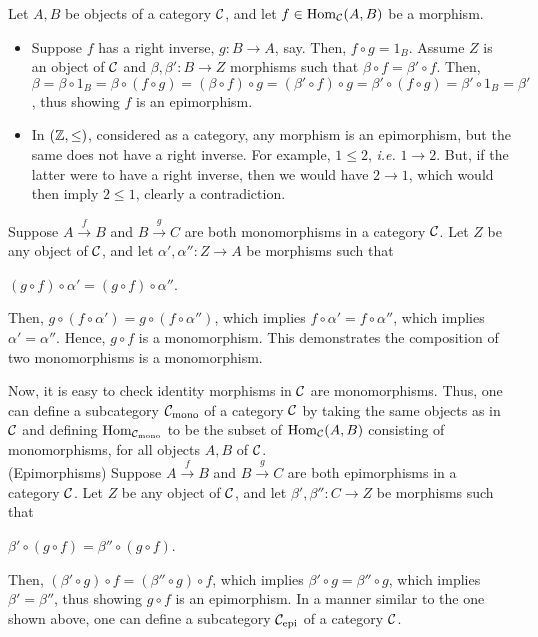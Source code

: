 \begin{xca}
Let $A, B$ be objects of a category $\mathcal{C}$, and let $f \in \operatorname{Hom}_{\mathcal{C}}(A,
B)$ be a morphism.
\begin{itemize}
    \item Suppose $f$ has a right inverse, $g: B \to A$, say. Then, $f \circ g
    = 1_B$. Assume $Z$ is an object of $\mathcal{C}$ and $\beta, \beta': B \to Z$
    morphisms such that $\beta \circ f = \beta' \circ f$. Then, $\beta = \beta
    \circ 1_B = \beta \circ (f \circ g) = (\beta \circ f) \circ g = (\beta'
    \circ f) \circ g = \beta' \circ (f \circ g) = \beta' \circ 1_B = \beta'$,
    thus showing $f$ is an epimorphism.
    \item In $(\mathbb{Z}, \le)$, considered as a category, any morphism is an
    epimorphism, but the same does not have a right inverse. For example, $1 \le
    2$, \emph{i.e.} $1 \to 2$. But, if the latter were to have a right inverse,
    then we would have $2 \to 1$, which would then imply $2 \le 1$, clearly a
    contradiction.
\end{itemize}
\end{xca}

\begin{xca}
Suppose $A \xrightarrow{f} B$ and $B \xrightarrow{g} C$ are both monomorphisms
in a category $\mathcal{C}$. Let $Z$ be any object of $\mathcal{C}$, and let $\alpha',
\alpha'': Z \to A$ be morphisms such that
\begin{center}
    $(g \circ f) \circ \alpha' = (g \circ f) \circ \alpha''$.
\end{center}
Then, $g \circ (f \circ \alpha') = g \circ (f \circ \alpha'')$, which implies
$f \circ \alpha' = f \circ \alpha''$, which implies $\alpha' = \alpha''$. Hence,
$g \circ f$ is a monomorphism. This demonstrates the composition of two
monomorphisms is a monomorphism.

Now, it is easy to check identity morphisms in $\mathcal{C}$ are monomorphisms. Thus,
one can define a subcategory $\mathcal{C}_{\text{mono}}$ of a category $\mathcal{C}$ by
taking the same objects as in $\mathcal{C}$ and defining
$\operatorname{Hom}_{\mathcal{C}_{\text{mono}}}$ to be the subset of $\operatorname{Hom}_{\mathcal{C}}(A, B)$
consisting of monomorphisms, for all objects $A, B$ of $\mathcal{C}$.\\

(Epimorphisms) Suppose $A \xrightarrow{f} B$ and $B \xrightarrow{g} C$ are both
epimorphisms in a category $\mathcal{C}$. Let $Z$ be any object of $\mathcal{C}$, and let
$\beta', \beta'': C \to Z$ be morphisms such that
\begin{center}
    $\beta' \circ (g \circ f) = \beta'' \circ (g \circ f)$.
\end{center}
Then, $(\beta' \circ g) \circ f = (\beta'' \circ g) \circ f$, which implies
$\beta' \circ g = \beta'' \circ g$, which implies $\beta' = \beta''$, thus
showing $g \circ f$ is an epimorphism. In a manner similar to the one shown
above, one can define a subcategory $\mathcal{C}_{\text{epi}}$ of a category
$\mathcal{C}$.
\end{xca}

